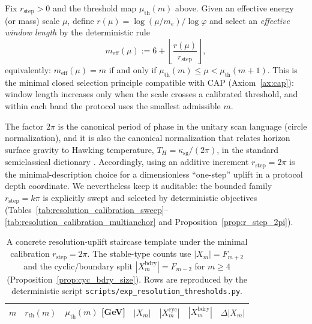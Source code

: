 \begin{corollary}\label{cor:resolution_selection}
Fix $r_{\mathrm{step}}>0$ and the threshold map $\mu_{\mathrm{th}}(m)$ above.
Given an effective energy (or mass) scale $\mu$, define $r(\mu)=\log(\mu/m_e)/\log\varphi$ and select an \emph{effective window length} by the deterministic rule
\[
m_{\mathrm{eff}}(\mu):=6+\left\lfloor \frac{r(\mu)}{r_{\mathrm{step}}}\right\rfloor,
\]
equivalently: $m_{\mathrm{eff}}(\mu)=m$ if and only if $\mu_{\mathrm{th}}(m)\le \mu < \mu_{\mathrm{th}}(m+1)$.
This is the minimal closed selection principle compatible with CAP (Axiom~\ref{ax:cap}): window length increases only when the scale crosses a calibrated threshold, and within each band the protocol uses the smallest admissible $m$.
\end{corollary}

\begin{remark}
The factor $2\pi$ is the canonical period of phase in the unitary scan language (circle normalization), and it is also the canonical normalization that relates horizon surface gravity to Hawking temperature, $T_H=\kappa_{\mathrm{sg}}/(2\pi)$, in the standard semiclassical dictionary \cite{Hawking1975,Wald1984}.
Accordingly, using an additive increment $r_{\mathrm{step}}=2\pi$ is the minimal-description choice for a dimensionless ``one-step'' uplift in a protocol depth coordinate.
We nevertheless keep it auditable: the bounded family $r_{\mathrm{step}}=k\pi$ is explicitly swept and selected by deterministic objectives (Tables~\ref{tab:resolution_calibration_sweep}--\ref{tab:resolution_calibration_multianchor} and Proposition~\ref{prop:r_step_2pi}).
\end{remark}

\begin{table}[t]
\centering
\small
\setlength{\tabcolsep}{6pt}
\renewcommand{\arraystretch}{1.15}
\begin{tabular}{rrrrrrr}
\toprule
$m$ & $r_{\mathrm{th}}(m)$ & $\mu_{\mathrm{th}}(m)$ [GeV] & $|X_m|$ & $|X_m^{\mathrm{cyc}}|$ & $|X_m^{\mathrm{bdry}}|$ & $\Delta|X_m|$ \\
\midrule
%
\end{tabular}
\caption{A concrete resolution-uplift staircase template under the minimal calibration $r_{\mathrm{step}}=2\pi$. The stable-type counts use $|X_m|=F_{m+2}$ and the cyclic/boundary split $|X_m^{\mathrm{bdry}}|=F_{m-2}$ for $m\ge 4$ (Proposition~\ref{prop:cyc_bdry_size}). Rows are reproduced by the deterministic script \texttt{scripts/exp\_resolution\_thresholds.py}.}
\label{tab:resolution_thresholds}
\end{table}

